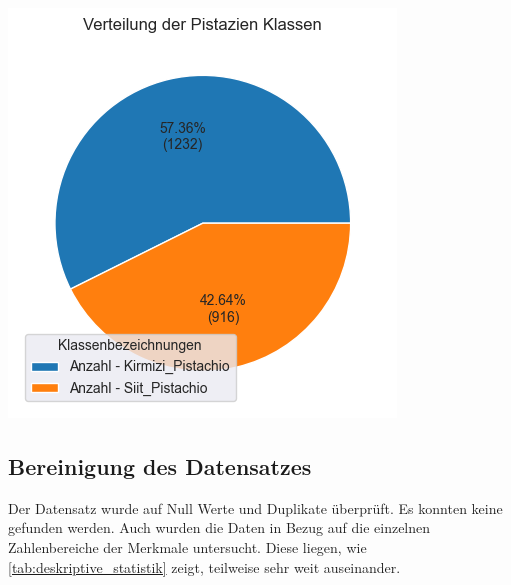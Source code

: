 {
	\centering
	\includegraphics[width=1\linewidth]{images/distribution_of_classes}
	\label{fig:distribution_of_classes}
}


\subsection{Bereinigung des Datensatzes}
\label{subsec:cleaning-the-data}
Der Datensatz wurde auf Null Werte und Duplikate überprüft. Es konnten keine gefunden werden.
Auch wurden die Daten in Bezug auf die einzelnen Zahlenbereiche der Merkmale untersucht. Diese liegen, wie \autoref{tab:deskriptive_statistik} zeigt, teilweise sehr weit auseinander.\\

